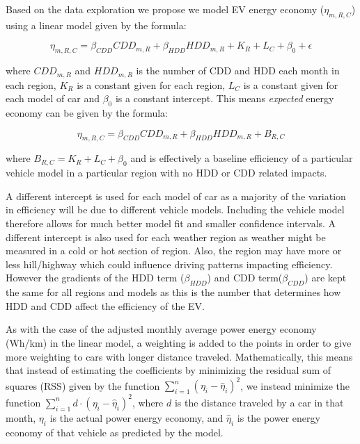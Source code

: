 \documentclass[
]{article}
\begin{document}
Based on the data exploration we propose we model EV energy economy
(\(\eta_{m,R,C}\)) using a linear model given by the formula:

\begin{equation}
\label{eq:linear_model}
\eta_{m,R,C} = \beta_{CDD}{CDD}_{m,R} + \beta_{HDD}{HDD}_{m,R} + K_R + L_C + \beta_0 + \epsilon
\end{equation}

where \({CDD}_{m,R}\) and \({HDD}_{m,R}\) is the number of CDD and HDD
each month in each region, \(K_R\) is a constant given for each region,
\(L_C\) is a constant given for each model of car and \(\beta_0\) is a
constant intercept. This means \emph{expected} energy economy can be
given by the formula:

\begin{equation}
\label{eq:economy_model}
\eta_{m,R,C} = \beta_{CDD}{CDD}_{m,R} + \beta_{HDD}{HDD}_{m,R} + B_{R,C}
\end{equation}

where \(B_{R,C} = K_R + L_C + \beta_0\) and is effectively a baseline
efficiency of a particular vehicle model in a particular region with no
HDD or CDD related impacts.

A different intercept is used for each model of car as a majority of the
variation in efficiency will be due to different vehicle models.
Including the vehicle model therefore allows for much better model fit
and smaller confidence intervals. A different intercept is also used for
each weather region as weather might be measured in a cold or hot
section of region. Also, the region may have more or less hill/highway
which could influence driving patterns impacting efficiency. However the
gradients of the HDD term (\(\beta_{HDD}\)) and CDD
term(\(\beta_{CDD}\)) are kept the same for all regions and models as
this is the number that determines how HDD and CDD affect the efficiency
of the EV.

As with the case of the adjusted monthly average power energy economy
(Wh/km) in the linear model, a weighting is added to the points in order
to give more weighting to cars with longer distance traveled.
Mathematically, this means that instead of estimating the coefficients
by minimizing the residual sum of squares (RSS) given by the function
\(\sum_{i =1}^{n}(\eta_{i}-\hat{\eta}_{i})^2\), we instead minimize the
function \(\sum_{i =1}^{n}d \cdot(\eta_{i}-\hat{\eta}_{i})^2\), where
\(d\) is the distance traveled by a car in that month, \(\eta_{i}\) is
the actual power energy economy, and \(\hat{\eta}_{i}\) is the power
energy economy of that vehicle as predicted by the model.
\end{document}
